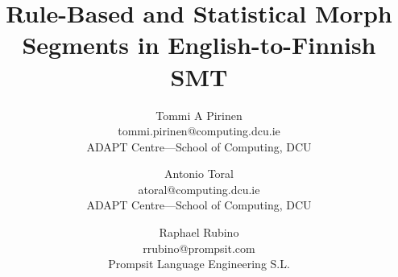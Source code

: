 \documentclass[free]{flammie}
\begin{document}
\title{Rule-Based and Statistical Morph Segments in English-to-Finnish SMT}


\author{\small Tommi A Pirinen \\
\small	tommi.pirinen@computing.dcu.ie \\
\small  ADAPT Centre---School of Computing, DCU \\
    \and
\small        Antonio Toral \\ 
\small        atoral@computing.dcu.ie\\ 
\small        ADAPT Centre---School of Computing, DCU \\
\and
\small       Raphael Rubino \\
\small       rrubino@prompsit.com\\
\small        Prompsit Language Engineering S.L.
}
\end{document}

